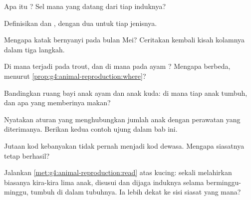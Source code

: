 \begin{exercise}[$\star$]\label{exo:g4:animal-reproduction:1}
Apa itu ? Sel mana yang datang dari tiap induknya?
\end{exercise}

\begin{exercise}[$\star$]\label{exo:g4:animal-reproduction:2}
Definisikan  dan , dengan dua  untuk tiap jenisnya.
\end{exercise}

\begin{exercise}[$\star$]\label{exo:g4:animal-reproduction:3}
Mengapa katak bernyanyi pada bulan Mei? Ceritakan kembali kisah
kolamnya dalam tiga langkah.
\end{exercise}

\begin{exercise}[$\star$]\label{exo:g4:animal-reproduction:4}
Di mana  terjadi pada  trout, dan di mana pada ayam
? Mengapa berbeda, menurut
\cref{prop:g4:animal-reproduction:where}?
\end{exercise}

\begin{exercise}[$\star$]\label{exo:g4:animal-reproduction:5}
Bandingkan ruang bayi anak ayam dan anak kuda: di mana tiap anak
tumbuh, dan apa yang memberinya makan?
\end{exercise}

\begin{exercise}[$\star$]\label{exo:g4:animal-reproduction:6}
Nyatakan aturan yang menghubungkan jumlah anak dengan perawatan yang
diterimanya. Berikan kedua contoh ujung dalam bab ini.
\end{exercise}

\begin{exercise}[$\star$]\label{exo:g4:animal-reproduction:7}
Jutaan   kod kebanyakan tidak pernah menjadi  kod dewasa.
Mengapa siasatnya tetap berhasil?
\end{exercise}

\begin{exercise}[$\star$]\label{exo:g4:animal-reproduction:8}
Jalankan \cref{met:g4:animal-reproduction:read} atas kucing: sekali
melahirkan biasanya kira-kira lima anak, disusui dan dijaga induknya
selama berminggu-minggu, tumbuh di dalam tubuhnya. Ia lebih dekat ke
sisi siasat yang mana?
\end{exercise}

